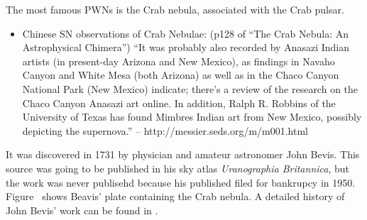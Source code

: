 The most famous \acp{PWN} is the Crab nebula, associated with
the Crab pulsar.

\begin{itemize}
  \item Chinese SN observations of Crab Nebulae: (p128 of ``The Crab Nebula: An Astrophysical Chimera'')
     ``It was probably also recorded by Anasazi Indian artists (in
     present-day Arizona and New Mexico), as findings in Navaho Canyon and
     White Mesa (both Arizona) as well as in the Chaco Canyon National
     Park (New Mexico) indicate; there's a review of the research on
     the Chaco Canyon Anasazi art online. In addition, Ralph R. Robbins
     of the University of Texas has found Mimbres Indian art from New
     Mexico, possibly depicting the supernova.'' -- http://messier.seds.org/m/m001.html
\end{itemize}

It was discovered in
1731 by physician and amateur astronomer John Bevis.  This source was
going to be published in his sky atlas {\em Uranographia Britannica}, but
the work was never publisehd because his published filed for bankrupcy
in 1950.  Figure~ shows Beavis' plate containing
the Crab nebula.  A detailed history of John Bevis' work can be found
in \cite{ashworth_1981_bevis-uranographia}.


